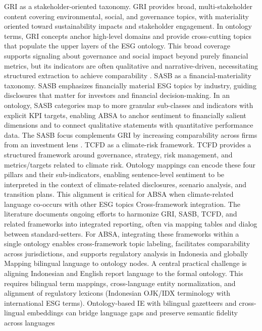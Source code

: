 GRI as a stakeholder-oriented taxonomy. GRI provides broad, multi-stakeholder content covering environmental, social, and governance topics, with materiality oriented toward sustainability impacts and stakeholder engagement. In ontology terms, GRI concepts anchor high-level domains and provide cross-cutting topics that populate the upper layers of the ESG ontology. This broad coverage supports signaling about governance and social impact beyond purely financial metrics, but its indicators are often qualitative and narrative-driven, necessitating structured extraction to achieve comparability \cite{10.1177/09726225241237304,10.1111/ejed.70225}.
SASB as a financial-materiality taxonomy. SASB emphasizes financially material ESG topics by industry, guiding disclosures that matter for investors and financial decision-making. In an ontology, SASB categories map to more granular sub-classes and indicators with explicit KPI targets, enabling ABSA to anchor sentiment to financially salient dimensions and to connect qualitative statements with quantitative performance data. The SASB focus complements GRI by increasing comparability across firms from an investment lens \cite{10.1177/09726225241237304,10.1111/ejed.70225}.
TCFD as a climate-risk framework. TCFD provides a structured framework around governance, strategy, risk management, and metrics/targets related to climate risk. Ontology mappings can encode these four pillars and their sub-indicators, enabling sentence-level sentiment to be interpreted in the context of climate-related disclosures, scenario analysis, and transition plans. This alignment is critical for ABSA when climate-related language co-occurs with other ESG topics \cite{10.1002/csr.70116,10.1017/s135732172300017x}
Cross-framework integration. The literature documents ongoing efforts to harmonize GRI, SASB, TCFD, and related frameworks into integrated reporting, often via mapping tables and dialog between standard-setters. For ABSA, integrating these frameworks within a single ontology enables cross-framework topic labeling, facilitates comparability across jurisdictions, and supports regulatory analysis in Indonesia and globally \cite{10.1007/978-3-319-04723-2_7,10.1108/ijlma-06-2022-0113,10.1145/3503044}
Mapping bilingual language to ontology nodes. A central practical challenge is aligning Indonesian and English report language to the formal ontology. This requires bilingual term mappings, cross-language entity normalization, and alignment of regulatory lexicons (Indonesian OJK/IDX terminology with international ESG terms). Ontology-based IE with bilingual gazetteers and cross-lingual embeddings can bridge language gaps and preserve semantic fidelity across languages \cite{10.1016/j.inffus.2025.103073,10.1111/eufm.12509,10.48550/arxiv.2511.00024}
